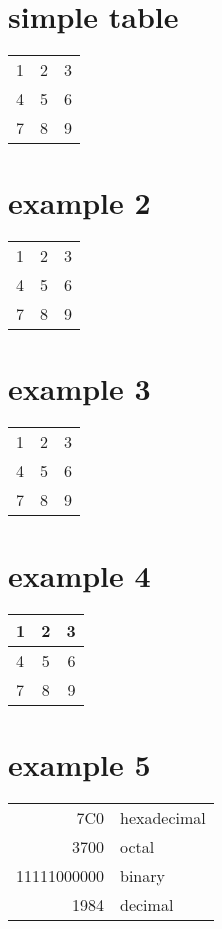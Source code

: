 \documentclass{article}
\begin{document}
\section{simple table}
\begin{tabular}{ l c r }
  1 & 2 & 3 \\
  4 & 5 & 6 \\
  7 & 8 & 9 \\
\end{tabular}

\section{example 2}
\begin{tabular}{ l | c || r }
  1 & 2 & 3 \\
  4 & 5 & 6 \\
  7 & 8 & 9 \\
\end{tabular}

\section{example 3}
\begin{tabular}{ l | c || r }
  \hline			
  1 & 2 & 3 \\
  4 & 5 & 6 \\
  7 & 8 & 9 \\
  \hline  
\end{tabular}

\section{example 4}
\begin{center}
  \begin{tabular}{ l | c || r }
    \hline
    1 & 2 & 3 \\ \hline
    4 & 5 & 6 \\ \hline
    7 & 8 & 9 \\
    \hline
  \end{tabular}
\end{center}

\section{example 5}
\begin{tabular}{|r|l|}
  \hline
  7C0 & hexadecimal \\
  3700 & octal \\ \cline{2-2}
  11111000000 & binary \\
  \hline \hline
  1984 & decimal \\
  \hline
\end{tabular}
\end{document}
